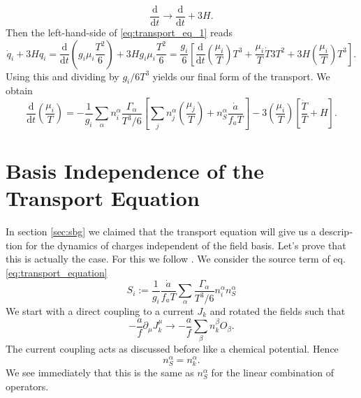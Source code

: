 \documentclass[master,       %
               twoside,        %
               BCOR10mm,       %
               english,ngerman, %
               ]{GAUBM}
\begin{document}
\begin{otherlanguage}{english}
\begin{equation}
	\frac{\mathrm{d}}{\mathrm{d} t} \to \frac{\mathrm{d}}{\mathrm{d} t} + 3 H.
\end{equation}
Then the left-hand-side of \eqref{eq:transport_eq_1} reads
\begin{equation}
	\dot{q}_i + 3 H q_i = \frac{\mathrm{d}}{\mathrm{d} t} \left( g_i \mu_i \frac{T^2}{6} \right) + 3 H g_i \mu_i \frac{T^2}{6} = \frac{g_i}{6} \left[ \frac{\mathrm{d}}{\mathrm{d} t} \left( \frac{\mu_i}{T} \right) T^3 + \frac{\mu_i}{T} \dot{T} 3 T^2 + 3 H \left( \frac{\mu_i}{T} \right) T^3 \right].
\end{equation}
Using this and dividing by $g_i / 6 T^3$ yields our final form of the transport. We obtain
\begin{equation}
	\label{eq:transport_equation}
	\boxed{
	\frac{\mathrm{d}}{\mathrm{d} t} \left( \frac{\mu_i}{T} \right) = - \frac{1}{g_i} \sum_\alpha n^\alpha_i \frac{\Gamma_\alpha}{T^3 / 6} \left[ \sum_j n_j^\alpha \left( \frac{\mu_j}{T} \right) + n_S^\alpha \frac{\dot{a}}{f_a T} \right] - 3 \left( \frac{\mu_i}{T} \right) \left[ \frac{\dot{T}}{T} + H \right].
	}
\end{equation}

\section{Basis Independence of the Transport Equation}

In section \ref{sec:sbg} we claimed that the transport equation will give us a description for the dynamics of charges independent of the field basis.
Let's prove that this is actually the case.
For this we follow \cite[sec. 2.2 ]{Domcke:2020kcp_Generic_Couplings}.
We consider the source term of eq. \eqref{eq:transport_equation}
\begin{equation}
	S_i := \frac{1}{g_i} \frac{\dot{a}}{f_a T} \sum_\alpha \frac{\Gamma_\alpha}{T^3 / 6} n_i^\alpha n_S^\alpha
\end{equation}
We start with a direct coupling to a current $J_k$ and rotated the fields such that
\begin{equation}
	- \frac{a}{f} \partial_\mu J^\mu_k \to - \frac{a}{f} \sum_\beta n_k^\beta O_\beta.
\end{equation}
The current coupling acts as discussed before like a chemical potential. Hence
\begin{equation}
	n_S^\alpha = n_k^\alpha.
\end{equation}
We see immediately that this is the same as $n_S^\alpha$ for the linear combination of operators.



\end{otherlanguage}
\end{document}
